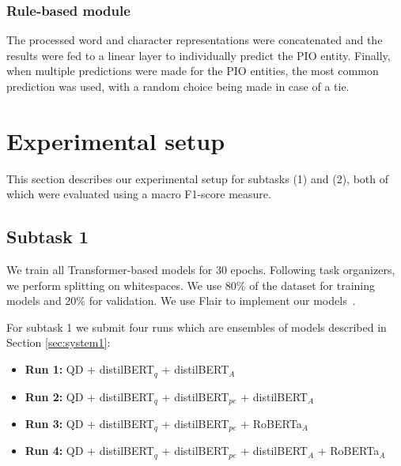 \documentclass[11pt]{article}
\begin{document}
\subsubsection{Rule-based module}
%
The processed word and character representations were concatenated and the results were fed to a linear layer to individually predict the PIO entity.
Finally, when multiple predictions were made for the PIO entities, the most common prediction was used, with a random choice being made in case of a tie.
%
%
%
\section{Experimental setup}
This section describes our experimental setup for subtasks (1) and (2), both of which were evaluated using a macro F1-score measure.
%
%
%
%
%
%
\subsection{Subtask 1}

We train all Transformer-based models for 30 epochs. 
Following task organizers, we perform splitting on whitespaces.
We use 80\% of the dataset for training models and 20\% for validation.
We use Flair to implement our models~\cite{Akbik2019FLAIRAE}.

For subtask 1 we submit four runs which are ensembles of models described in Section \ref{sec:system1}:

\begin{itemize}
\item \textbf{Run 1:} QD + distilBERT$_q$ + distilBERT$_A$
\item \textbf{Run 2:} QD + distilBERT$_q$ + distilBERT$_{pe}$ + distilBERT$_A$
\item \textbf{Run 3:} QD + distilBERT$_q$ + distilBERT$_{pe}$ + RoBERTa$_A$
\item \textbf{Run 4:} QD + distilBERT$_q$ + distilBERT$_{pe}$ + distilBERT$_A$ + RoBERTa$_A$ 
\end{itemize}
\end{document}
